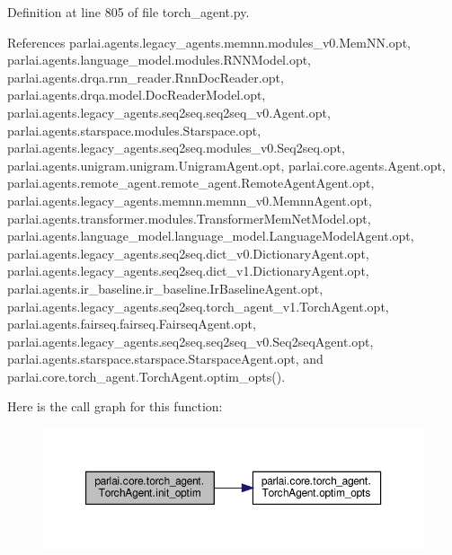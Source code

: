 Definition at line 805 of file torch\+\_\+agent.\+py.



References parlai.\+agents.\+legacy\+\_\+agents.\+memnn.\+modules\+\_\+v0.\+Mem\+N\+N.\+opt, parlai.\+agents.\+language\+\_\+model.\+modules.\+R\+N\+N\+Model.\+opt, parlai.\+agents.\+drqa.\+rnn\+\_\+reader.\+Rnn\+Doc\+Reader.\+opt, parlai.\+agents.\+drqa.\+model.\+Doc\+Reader\+Model.\+opt, parlai.\+agents.\+legacy\+\_\+agents.\+seq2seq.\+seq2seq\+\_\+v0.\+Agent.\+opt, parlai.\+agents.\+starspace.\+modules.\+Starspace.\+opt, parlai.\+agents.\+legacy\+\_\+agents.\+seq2seq.\+modules\+\_\+v0.\+Seq2seq.\+opt, parlai.\+agents.\+unigram.\+unigram.\+Unigram\+Agent.\+opt, parlai.\+core.\+agents.\+Agent.\+opt, parlai.\+agents.\+remote\+\_\+agent.\+remote\+\_\+agent.\+Remote\+Agent\+Agent.\+opt, parlai.\+agents.\+legacy\+\_\+agents.\+memnn.\+memnn\+\_\+v0.\+Memnn\+Agent.\+opt, parlai.\+agents.\+transformer.\+modules.\+Transformer\+Mem\+Net\+Model.\+opt, parlai.\+agents.\+language\+\_\+model.\+language\+\_\+model.\+Language\+Model\+Agent.\+opt, parlai.\+agents.\+legacy\+\_\+agents.\+seq2seq.\+dict\+\_\+v0.\+Dictionary\+Agent.\+opt, parlai.\+agents.\+legacy\+\_\+agents.\+seq2seq.\+dict\+\_\+v1.\+Dictionary\+Agent.\+opt, parlai.\+agents.\+ir\+\_\+baseline.\+ir\+\_\+baseline.\+Ir\+Baseline\+Agent.\+opt, parlai.\+agents.\+legacy\+\_\+agents.\+seq2seq.\+torch\+\_\+agent\+\_\+v1.\+Torch\+Agent.\+opt, parlai.\+agents.\+fairseq.\+fairseq.\+Fairseq\+Agent.\+opt, parlai.\+agents.\+legacy\+\_\+agents.\+seq2seq.\+seq2seq\+\_\+v0.\+Seq2seq\+Agent.\+opt, parlai.\+agents.\+starspace.\+starspace.\+Starspace\+Agent.\+opt, and parlai.\+core.\+torch\+\_\+agent.\+Torch\+Agent.\+optim\+\_\+opts().

Here is the call graph for this function\+:
\nopagebreak
\begin{figure}[H]
\begin{center}
\leavevmode
\includegraphics[width=350pt]{classparlai_1_1core_1_1torch__agent_1_1TorchAgent_a3784f1ddaa6ffad009716910f3f36dd4_cgraph}
\end{center}
\end{figure}
\mbox{\label{classparlai_1_1core_1_1torch__agent_1_1TorchAgent_afa491bf2384b017711ad722b5341b405}} 

